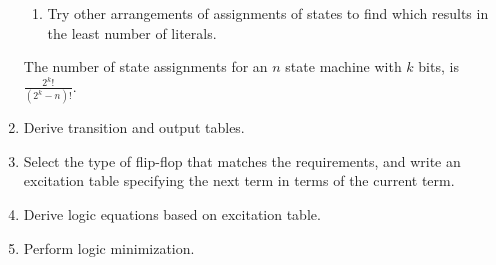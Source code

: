 \documentclass[nobib]{tufte-handout}
\begin{document}
\begin{enumerate}
\begin{enumerate}
              \item Try other arrangements of assignments of states to find which results in the least number of literals. 
          \end{enumerate}
          The number of state assignments for an $n$ state machine with $k$ bits, is $\frac{2^k!}{(2^k-n)!}$.
    \item Derive transition and output tables.
    \item Select the type of flip-flop that matches the requirements, and write an
          excitation table specifying the next term in terms of the current term.\\
    \item Derive logic equations based on excitation table.
    \item Perform logic minimization.
\end{enumerate}
\end{document}
